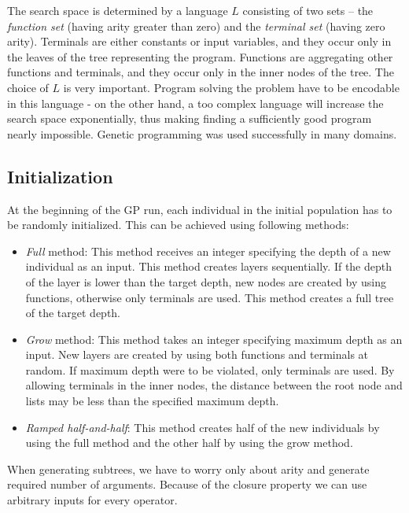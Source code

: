  The search space is determined by a language $L$ consisting of two sets – the \emph{function set} (having arity greater than zero) and the \emph{terminal set} (having zero arity). Terminals are either constants or input variables, and they occur only in the leaves of the tree representing the program. Functions are aggregating other functions and terminals, and they occur only in the inner nodes of the tree. The choice of $L$ is very important. Program solving the problem have to be encodable in this language - on the other hand, a too complex language will increase the search space exponentially, thus making finding a sufficiently good program nearly impossible. Genetic programming was used successfully in many domains. 
 
 \subsection{Initialization}
 At the beginning of the GP run, each individual in the initial population has to be randomly initialized. This can be achieved using following methods:
 
 \begin{itemize}
 	\item \emph{Full} method: This method receives an integer specifying the depth of a new individual as an input. This method creates layers sequentially. If the depth of the layer is lower than the target depth, new nodes are created by using functions, otherwise only terminals are used. This method creates a full tree of the target depth.
 	\item \emph{Grow} method: This method takes an integer specifying maximum depth as an input. New layers are created by using both functions and terminals at random. If maximum depth were to be violated, only terminals are used. By allowing terminals in the inner nodes, the distance between the root node and lists may be less than the specified maximum depth.
 	\item \emph{Ramped half-and-half}: This method creates half of the new individuals by using the full method and the other half by using the grow method.
 \end{itemize}
 
 When generating subtrees, we have to worry only about arity and generate required number of arguments. Because of the closure property we can use arbitrary inputs for every operator.
 
